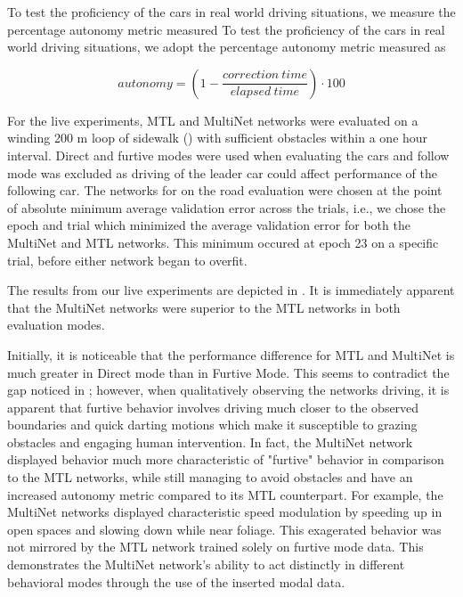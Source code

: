 To test the proficiency of the cars in real world driving situations, we measure the percentage autonomy metric \cite{bojarski2016end} measured To test the proficiency of the cars in real world driving situations, we adopt the percentage autonomy metric \cite{bojarski2016end} measured as

\begin{equation}
    autonomy = (1 - \dfrac{correction\ time}{elapsed\ time}) \cdot 100
   \label{eq:autonomy}
\end{equation}

For the live experiments, MTL and MultiNet networks were evaluated on a winding 200 m loop of sidewalk () with sufficient obstacles within a one hour interval. Direct and furtive modes were used when evaluating the cars and follow mode was excluded as driving of the leader car could affect performance of the following car. The networks for on the road evaluation were chosen at the point of absolute minimum average validation error across the trials, i.e., we chose the epoch and trial which minimized the average validation error for both the MultiNet and MTL networks. This minimum occured at epoch 23 on a specific trial, before either network began to overfit. 


The results from our live experiments are depicted in . It is immediately apparent that the MultiNet networks were superior to the MTL networks in both evaluation modes. 

Initially, it is noticeable that the performance difference for MTL and MultiNet is much greater in Direct mode than in Furtive Mode. This seems to contradict the gap noticed in ; however, when qualitatively observing the networks driving, it is apparent that furtive behavior involves driving much closer to the observed boundaries and quick darting motions which make it susceptible to grazing obstacles and engaging human intervention. In fact, the MultiNet network displayed behavior much more characteristic of "furtive" behavior in comparison to the MTL networks, while still managing to avoid obstacles and have an increased autonomy metric compared to its MTL counterpart. For example, the MultiNet networks displayed characteristic speed modulation by speeding up in open spaces and slowing down while near foliage. This exagerated behavior was not mirrored by the MTL network trained solely on furtive mode data. This demonstrates the MultiNet network's ability to act distinctly in different behavioral modes through the use of the inserted modal data.


